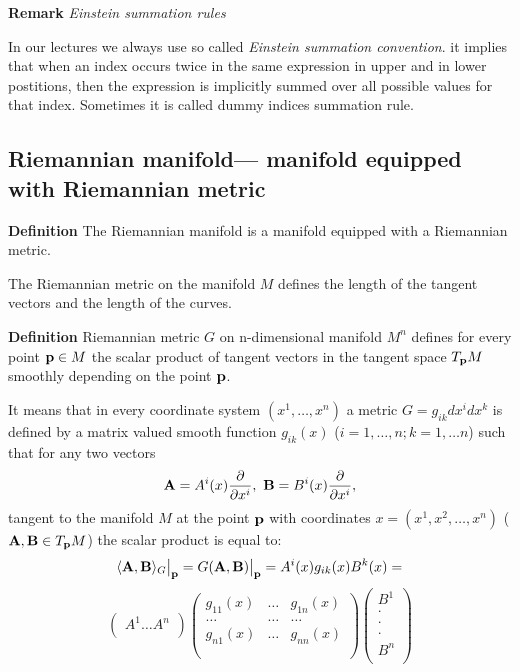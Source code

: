 \documentclass[12pt]{article}
\theoremstyle{theorem}
\numberwithin{equation}{section}
\begin{document}
{\bf Remark} {\it Einstein summation rules}


 In our lectures we always use so called {\it Einstein summation convention}.
 it  implies that when an index occurs twice
in the same expression in upper and in lower postitions, then
 the expression is implicitly summed over all possible values
for that index.
  Sometimes it is called dummy indices summation rule.




    \subsection {Riemannian manifold---
manifold equipped with Riemannian metric}

{\bf Definition} The Riemannian manifold is a
manifold equipped with a Riemannian metric.




  The Riemannian metric on the manifold $M$ defines the
  length of the tangent vectors and the length of the curves.

{\bf Definition}
  Riemannian metric $G$ on n-dimensional manifold $M^n$
  defines for every point ${\bf p}\in M$ the scalar product
  of tangent vectors in the tangent space $T_{\bf p} M$
  smoothly depending on the point ${\bf p} $.

  It means that in every coordinate system $(x^1,\dots,x^n)$
  a metric $G=g_{ik}dx^idx^k$ is defined by a matrix valued smooth function $g_{ik}(x)$ ($i=1,\dots,n;k=1,\dots n$)
  such that for any two vectors
       $$
  {\bf A}=A^i(x){\partial\over \partial x^i},\,\, {\bf B}=B^i(x){\partial\over \partial x^i},
      $$
tangent to the manifold $M$ at the point ${\bf p}$ with coordinates $x=(x^1,x^2,\dots,x^n)$ (${\bf A},{\bf B}\in T_{{\bf p}}M$)
the scalar product is equal to:
              $$
              \langle{\bf A},{\bf B}\rangle_G\big\vert_{\bf p}= G({\bf A},{\bf B})\big\vert_{\bf p}=
A^i(x)g_{ik}(x)B^k(x)=
            $$
            \begin{equation}\label{scalarproduct}
  \begin{pmatrix}
   A^1 \dots A^n\\
   \end{pmatrix}
  \begin{pmatrix}
     g_{11}(x)&\dots &g_{1n}(x)\\
      \dots &\dots & \dots \\
         g_{n1}(x)&\dots &g_{nn}(x)\\  \\
   \end{pmatrix}
\begin{pmatrix}
   B^1\\
     \cdot \\
   \cdot\\
   \cdot\\
   B^n\\
   \end{pmatrix}
\end{equation}
\end{document}
